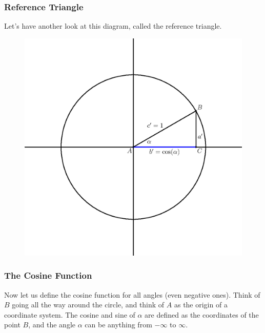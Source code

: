 \documentclass[xcolor=dvipsnames]{beamer}
\begin{document}
\begin{frame}
  \frametitle{Reference Triangle}
  Let's have another look at this diagram, called the \alert{reference
  triangle}. 
  \begin{figure}[h]
    \includegraphics[scale=.5]{./cosine.eps}
  \end{figure}
\end{frame}

\begin{frame}
  \frametitle{The Cosine Function}
  Now let us define the cosine function for all angles (even negative
  ones). Think of $B$ going all the way around the circle, and think
  of $A$ as the origin of a coordinate system. The cosine and sine of
  $\alpha$ are defined as the coordinates of the point $B$, and the angle
  $\alpha$ can be anything from $-\infty$ to $\infty$. 
\end{frame}
\end{document}

